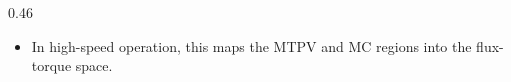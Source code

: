 \begin{frame}
\begin{columns}[c,onlytextwidth]
\begin{column}{0.46\textwidth}
\begin{itemize}
                      $$
                          T_{\lim}(\psi_{\mathrm{lim}})=\max_{\bm{i}}\,T(\bm{i})
                      $$
                      under voltage and current constraints:
                      $$\text{s.t.}\quad
                          \|\bm{\psi}(\bm{i})\|_2\le \psi_{\mathrm{lim}},\quad
                          \|\bm{i}\|_2\le i_{\mathrm{max}} .
                      $$
                \item In high-speed operation, this maps the MTPV and MC regions into the flux-torque space.
            \end{itemize}
        \end{column}
    \end{columns}
\end{frame}

